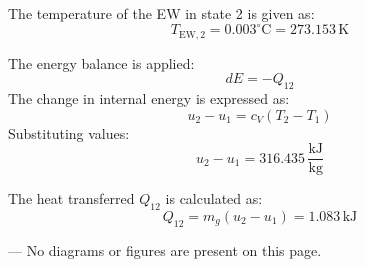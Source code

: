 The temperature of the EW in state 2 is given as:  
\[
T_{\text{EW},2} = 0.003^\circ\text{C} = 273.153 \, \text{K}
\]  

The energy balance is applied:  
\[
dE = -Q_{12}
\]  
The change in internal energy is expressed as:  
\[
u_2 - u_1 = c_V (T_2 - T_1)
\]  
Substituting values:  
\[
u_2 - u_1 = 316.435 \, \frac{\text{kJ}}{\text{kg}}
\]  

The heat transferred \( Q_{12} \) is calculated as:  
\[
Q_{12} = m_g (u_2 - u_1) = 1.083 \, \text{kJ}
\]  

---  
No diagrams or figures are present on this page.
